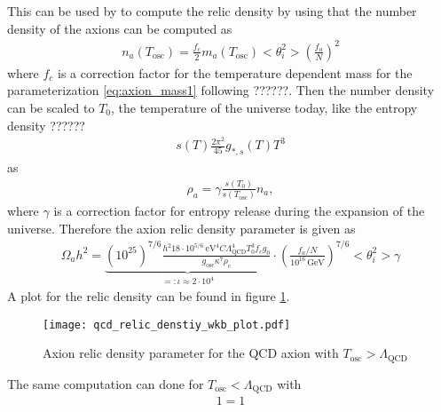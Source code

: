 \documentclass[a4paper]{article}
\begin{document}
This can be used by to compute the relic density by using that the number density of the axions can be computed as
\begin{align*}
    n_a(T_\mathrm{osc}) = \frac{f_c}{2} m_a(T_\mathrm{osc}) < \theta_i^2 > \left( \frac{f_a}{N} \right)^2
\end{align*}
where $f_c$ is a correction factor for the temperature dependent mass for the parameterization \ref{eq:axion_mass1} following ??????.
Then the number density can be scaled to $T_0$, the temperature of the universe today, like the entropy density ??????
\begin{align}
    \label{eq:entropy_density}
    s(T) \frac{2 \pi^2}{45} g_{*, s}(T) T^3
\end{align}
as
\begin{align*}
    \rho_a = \gamma \frac{s(T_0)}{s(T_\mathrm{osc})} n_a,
\end{align*}
where $\gamma$ is a correction factor for entropy release during the expansion of the universe.
Therefore the axion relic density parameter is given as
\begin{align}
    \label{eq:relic_density_high_temp}
    \Omega_a h^2 = \underbrace{
   \left(10^{25}\right)^{7/6} \frac{h^2 18 \cdot 10^{5/6} \, \mathrm{eV}^4 C \Lambda_\mathrm{QCD}^4 T_0^3 f_c g_0 }{g_\mathrm{osc} \kappa^7 \rho_c}  
    }_{=: \iota \approx 2 \cdot 10^4} \cdot \left( \frac{f_a / N}{10^{16} \, \mathrm{GeV}}\right) ^ {7 / 6} < \theta_i^2 > \gamma
\end{align}
A plot for the relic density can be found in figure \ref{fig:qcd_wkb_plot}.
\begin{figure}
    \centering
    \texttt{[image: qcd\_relic\_denstiy\_wkb\_plot.pdf]}
    \caption{Axion relic density parameter for the QCD axion with $T_\mathrm{osc} > \Lambda_\mathrm{QCD}$}
    \label{fig:qcd_wkb_plot}
\end{figure}
The same computation can done for $T_\mathrm{osc} < \Lambda_\mathrm{QCD}$ with
\begin{align}
    \label{eq:axion_mass2}
    1 = 1
\end{align}
\end{document}
